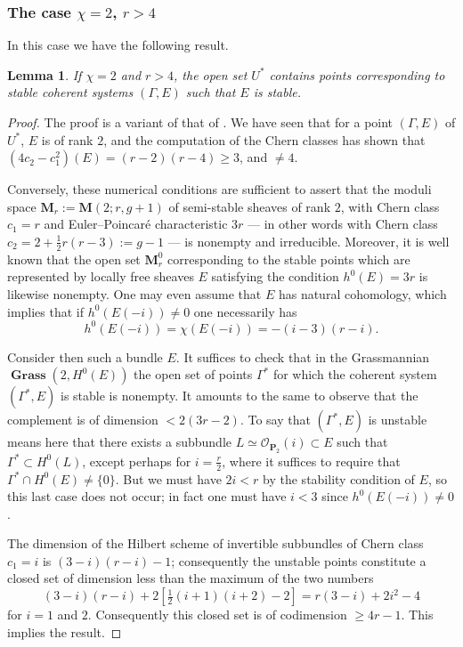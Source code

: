 \documentclass[12pt,english]{smfart}%
\theoremstyle{plain}
\newtheorem{lemma}[theorem]{Lemma}
\theoremstyle{definition}
\theoremstyle{remark}
\newcommand{\PP}{\mathbf{P}}
\newcommand{\MM}{\mathbf{M}}           %
\newcommand{\Oo}{\mathcal{O}}
\DeclareMathOperator{\Grass}{\mathbf{Grass}}
\begin{document}
\subsubsection*{The case $\chi=2$, $r>4$}

In this case we have the following result.

\begin{lemma}\label{lem:chi2-r4}
If $\chi=2$ and $r>4$, the open set $U^{*}$ contains points corresponding to stable coherent systems $(\Gamma,E)$ such that $E$ is stable.
\end{lemma}

\begin{proof}
The proof is a variant of that of . We have seen that for a point $(\Gamma,E)$ of $U^{*}$, $E$ is of rank $2$, and the computation of the Chern classes has shown that $(4c_2-c_1^2)(E)=(r-2)(r-4)\ge 3$, and $\neq 4$.

Conversely, these numerical conditions are sufficient to assert that the moduli space $\MM_r := \MM(2;r,g+1)$ of semi-stable sheaves of rank $2$, with Chern class $c_1=r$ and Euler--Poincar\'e characteristic $3r$ --- in other words with Chern class $c_2 = 2+\tfrac12 r(r-3) := g-1$ --- is nonempty and irreducible. Moreover, it is well known \cite{LeP1} that the open set $\MM^0_r$ corresponding to the stable points which are represented by locally free sheaves $E$ satisfying the condition $h^0(E)=3r$ is likewise nonempty. One may even assume that $E$ has natural cohomology, which implies that if $h^0(E(-i))\neq 0$ one necessarily has
\[
h^0(E(-i)) = \chi(E(-i)) = -(i-3)(r-i).
\]

Consider then such a bundle $E$. It suffices to check that in the Grassmannian $\Grass(2,H^0(E))$ the open set of points $\Gamma^{*}$ for which the coherent system $(\Gamma^{*},E)$ is stable is nonempty. It amounts to the same to observe that the complement is of dimension $<2(3r-2)$. To say that $(\Gamma^{*},E)$ is unstable means here that there exists a subbundle $L\simeq\Oo_{\PP_2}(i)\subset E$ such that $\Gamma^{*}\subset H^0(L)$, except perhaps for $i=\tfrac r2$, where it suffices to require that $\Gamma^{*}\cap H^0(E)\neq\{0\}$. But we must have $2i<r$ by the stability condition of $E$, so this last case does not occur; in fact one must have $i<3$ since $h^0(E(-i))\neq 0$.

The dimension of the Hilbert scheme of invertible subbundles of Chern class $c_1=i$ is $(3-i)(r-i)-1$; consequently the unstable points constitute a closed set of dimension less than the maximum of the two numbers
\[
(3-i)(r-i)+2\left[\tfrac12(i+1)(i+2)-2\right] = r(3-i)+2i^2-4
\]
for $i=1$ and $2$. Consequently this closed set is of codimension $\ge 4r-1$. This implies the result.
\end{proof}
\end{document}
